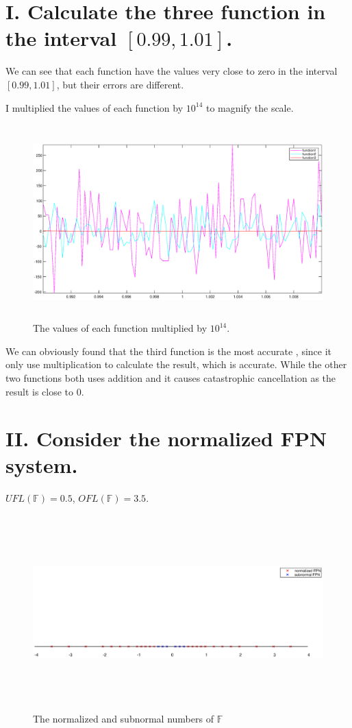 \documentclass[twoside,a4paper]{article}
\begin{document}
\pagestyle{fancy}
\fancyhead{}


\section*{I. \small{Calculate the three function in the interval $[0.99, 1.01]$.} }

We can see that each function have the values very close to zero 
in the interval $[0.99, 1.01]$, but their errors are different.

I multiplied the values of each function by $10^{14}$ to magnify the scale.
\begin{figure}[ht]
        \centering
        \includegraphics[width=15cm, height=7.5cm]{Plot1.eps}
        \caption{The values of each function multiplied by $10^{14}$.}
\end{figure} 
We can obviously found that the third function is the most accurate
, since it only use multiplication to calculate the result, which is accurate.
While the other two functions both uses addition and it causes catastrophic 
cancellation as the result is close to 0.


\section*{II. \small{Consider the normalized FPN system.}}

$UFL\left( \mathbb{F} \right)=0.5 $, $OFL\left( \mathbb{F} \right)= 3.5$.

\begin{figure}[ht]
        \centering
        \includegraphics[width=15cm, height=7.5cm]{Plot2.eps}
	\caption{The normalized and subnormal numbers of $\mathbb{F}$}
\end{figure} 
\end{document}
